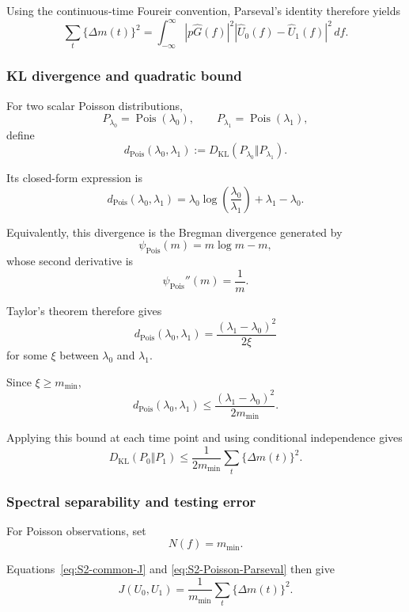 Using the continuous-time Foureir convention, Parseval's identity therefore yields
\begin{equation}
\label{eq:S2-Poisson-Parseval}
\sum_t
\{\Delta m(t)\}^2
=
\int_{-\infty}^{\infty}
|p\widehat G(f)|^2
\left|
\widehat U_0(f)-\widehat U_1(f)
\right|^2
\,df.
\end{equation}

\subsubsection{KL divergence and quadratic bound}
For two scalar Poisson distributions,
\[
P_{\lambda_0}
=
\operatorname{Pois}(\lambda_0),
\qquad
P_{\lambda_1}
=
\operatorname{Pois}(\lambda_1),
\]
define
\[
d_{\mathrm{Pois}}(\lambda_0,\lambda_1)
:=
D_{\mathrm{KL}}
\!\left(
P_{\lambda_0}
\Vert
P_{\lambda_1}
\right).
\]

Its closed-form expression is
\[
d_{\mathrm{Pois}}(\lambda_0,\lambda_1)
=
\lambda_0
\log\!\left(
\frac{\lambda_0}{\lambda_1}
\right)
+
\lambda_1-\lambda_0.
\]

Equivalently, this divergence is the Bregman divergence generated by
\[
\psi_{\mathrm{Pois}}(m)
=
m\log m-m,
\]
whose second derivative is
\[
\psi_{\mathrm{Pois}}''(m)
=
\frac{1}{m}.
\]

Taylor's theorem therefore gives
\[
d_{\mathrm{Pois}}(\lambda_0,\lambda_1)
=
\frac{
(\lambda_1-\lambda_0)^2
}{
2\xi
}
\]
for some \(\xi\) between \(\lambda_0\) and \(\lambda_1\).

Since \(\xi\ge m_{\min}\),
\[
d_{\mathrm{Pois}}(\lambda_0,\lambda_1)
\le
\frac{
(\lambda_1-\lambda_0)^2
}{
2m_{\min}
}.
\]

Applying this bound at each time point and using conditional
independence gives
\begin{equation}
\label{eq:S2-Poisson-KL-upper}
D_{\mathrm{KL}}(P_0\Vert P_1)
\le
\frac{1}{2m_{\min}}
\sum_t
\{\Delta m(t)\}^2.
\end{equation}

\subsubsection{Spectral separability and testing error}

For Poisson observations, set
\[
N(f)=m_{\min}.
\]

Equations~\eqref{eq:S2-common-J} and
\eqref{eq:S2-Poisson-Parseval} then give
\[
J(U_0,U_1)
=
\frac{1}{m_{\min}}
\sum_t
\{\Delta m(t)\}^2.
\]

